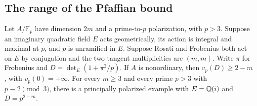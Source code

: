 \subsection{The range of the Pfaffian bound}

\begin{proposition}\label{prop:pfaffian-range}
Let \(A/\mathbb F_p\) have dimension \(2m\) and a prime-to-\(p\)
polarization, with \(p>3\). Suppose an imaginary quadratic field \(E\)
acts geometrically, its action is integral and maximal at \(p\), and
\(p\) is unramified in \(E\). Suppose Rosati and Frobenius both act on
\(E\) by conjugation and the two tangent multiplicities are \((m,m)\).
Write \(\pi\) for Frobenius and \(D=\det_E(1+\pi^2/p)\). If \(A\)
is nonordinary, then \(v_p(D)\ge 2-m\), with \(v_p(0)=+\infty\).
For every \(m\ge3\) and every prime \(p>3\) with \(p\equiv2\pmod3\),
there is a principally polarized example with \(E=\mathbb Q(i)\) and
\(D=p^{2-m}\).
\end{proposition}

